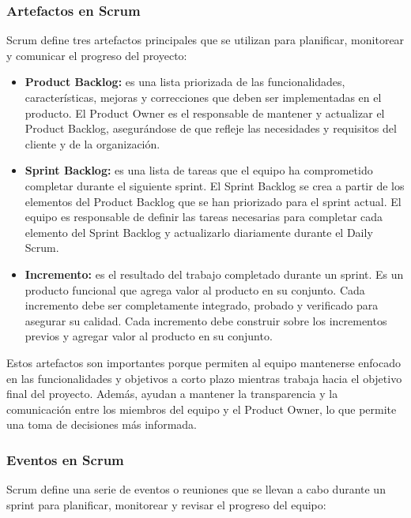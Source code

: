 \documentclass[executivepaper]{article}
\begin{document}
\subsubsection*{Artefactos en Scrum}

Scrum define tres artefactos principales que se utilizan para planificar, monitorear y comunicar el progreso del proyecto:

\begin{itemize}
\item \textbf{Product Backlog:} es una lista priorizada de las funcionalidades, características, mejoras y correcciones que deben ser implementadas en el producto. El Product Owner es el responsable de mantener y actualizar el Product Backlog, asegurándose de que refleje las necesidades y requisitos del cliente y de la organización.
\item \textbf{Sprint Backlog:} es una lista de tareas que el equipo ha comprometido completar durante el siguiente sprint. El Sprint Backlog se crea a partir de los elementos del Product Backlog que se han priorizado para el sprint actual. El equipo es responsable de definir las tareas necesarias para completar cada elemento del Sprint Backlog y actualizarlo diariamente durante el Daily Scrum.
\item \textbf{Incremento:} es el resultado del trabajo completado durante un sprint. Es un producto funcional que agrega valor al producto en su conjunto. Cada incremento debe ser completamente integrado, probado y verificado para asegurar su calidad. Cada incremento debe construir sobre los incrementos previos y agregar valor al producto en su conjunto.
\end{itemize}

Estos artefactos son importantes porque permiten al equipo mantenerse enfocado en las funcionalidades y objetivos a corto plazo mientras trabaja hacia el objetivo final del proyecto. Además, ayudan a mantener la transparencia y la comunicación entre los miembros del equipo y el Product Owner, lo que permite una toma de decisiones más informada.

\subsubsection*{Eventos en Scrum}

Scrum define una serie de eventos o reuniones que se llevan a cabo durante un sprint para planificar, monitorear y revisar el progreso del equipo:
\end{document}
